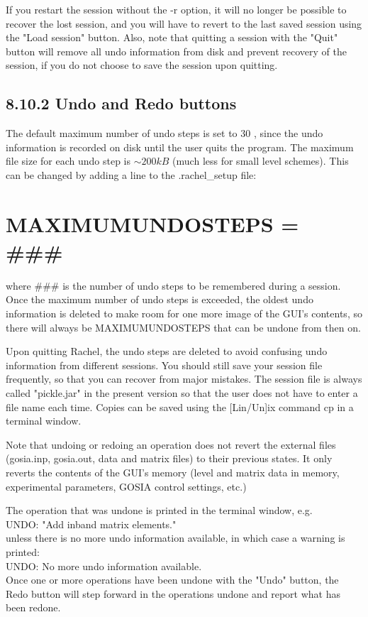 \documentclass[10pt]{article}
\begin{document}
If you restart the session without the -r option, it will no longer be possible to recover the lost session, and you will have to revert to the last saved session using the "Load session" button. Also, note that quitting a session with the "Quit" button will remove all undo information from disk and prevent recovery of the session, if you do not choose to save the session upon quitting.

\subsection*{8.10.2 Undo and Redo buttons}
The default maximum number of undo steps is set to 30 , since the undo information is recorded on disk until the user quits the program. The maximum file size for each undo step is $\sim 200 k B$ (much less for small level schemes). This can be changed by adding a line to the .rachel\_setup file:

\section*{MAXIMUMUNDOSTEPS = \#\#\#}
where $\# \# \#$ is the number of undo steps to be remembered during a session.\\
Once the maximum number of undo steps is exceeded, the oldest undo information is deleted to make room for one more image of the GUI's contents, so there will always be MAXIMUMUNDOSTEPS that can be undone from then on.

Upon quitting Rachel, the undo steps are deleted to avoid confusing undo information from different sessions. You should still save your session file frequently, so that you can recover from major mistakes. The session file is always called "pickle.jar" in the present version so that the user does not have to enter a file name each time. Copies can be saved using the [Lin/Un]ix command cp in a terminal window.

Note that undoing or redoing an operation does not revert the external files (gosia.inp, gosia.out, data and matrix files) to their previous states. It only reverts the contents of the GUI's memory (level and matrix data in memory, experimental parameters, GOSIA control settings, etc.)

The operation that was undone is printed in the terminal window, e.g.\\
UNDO: "Add inband matrix elements."\\
unless there is no more undo information available, in which case a warning is printed:\\
UNDO: No more undo information available.\\
Once one or more operations have been undone with the "Undo" button, the Redo button will step forward in the operations undone and report what has been redone.
\end{document}
